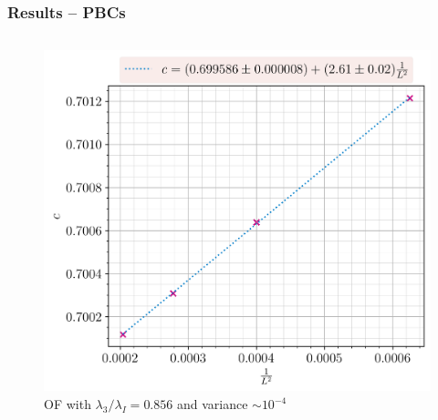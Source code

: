 \documentclass[10pt]{beamer}
\begin{document}
\begin{frame}
    \frametitle{Results -- PBCs}

    \begin{columns}
        \begin{column}{0.55\linewidth}
            \begin{figure}
                \hspace{-0.8cm}
                \includegraphics[scale=0.43]{../../graphs/entropies/pbc/10-4/calabrese_J=1.0_h=1.0_i=1.0_3=0.856_c=0.0.png}
                \caption{OF with $\lambda_3/\lambda_I=0.856$ and variance $\sim 10^{-4}$}
            \end{figure}
        \end{column}


\end{columns}
\end{frame}
\end{document}
